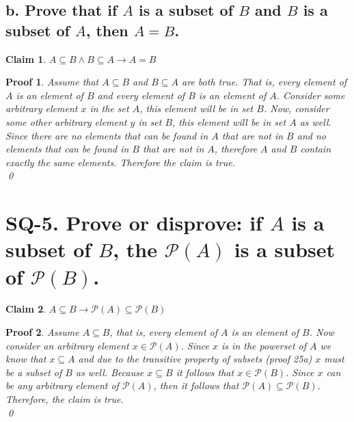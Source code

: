 \documentclass{article}
\newtheorem*{claim}{Claim}
\newtheorem*{poof}{Proof}
\begin{document}
\subsection*{b. Prove that if $A$ is a subset of $B$ and $B$ is a subset of $A$, then $A=B$.}
\begin{claim}
    $A \subseteq B \wedge B \subseteq A \rightarrow A = B$
\end{claim}
\begin{poof}
    Assume that $A \subseteq B$ and $B \subseteq A$ are both true. That is, every element of $A$ is an element of $B$ and every element of $B$ is an element of $A$. Consider some arbitrary element $x$ in the set $A$, this element will be in set $B$. Now, consider some other arbitrary element $y$ in set $B$, this element will be in set $A$ as well. Since there are no elements that can be found in $A$ that are not in $B$ and no elements that can be found in $B$ that are not in $A$, therefore $A$ and $B$ contain exactly the same elements. Therefore the claim is true. \\ 
    \qed
\end{poof}

\newpage

\section*{SQ-5. Prove or disprove: if $A$ is a subset of $B$, the $\mathscr{P}(A)$ is a subset of $\mathscr{P}(B)$.}
\begin{claim}
    $A \subseteq B \rightarrow \mathscr{P}(A) \subseteq \mathscr{P}(B)$
\end{claim}
\begin{poof}
    Assume $A \subseteq B$, that is, every element of $A$ is an element of $B$. Now consider an arbitrary element $x \in \mathscr{P}(A)$. Since $x$ is in the powerset of $A$ we know that $x \subseteq A$ and due to the transitive property of subsets (proof 25a) $x$ must be a subset of $B$ as well. Because $x \subseteq B$ it follows that $x \in \mathscr{P}(B)$. Since $x$ can be any arbitrary element of $\mathscr{P}(A)$, then it follows that $\mathscr{P}(A) \subseteq \mathscr{P}(B)$. Therefore, the claim is true.\\
    \qed

\end{poof}
\end{document}
